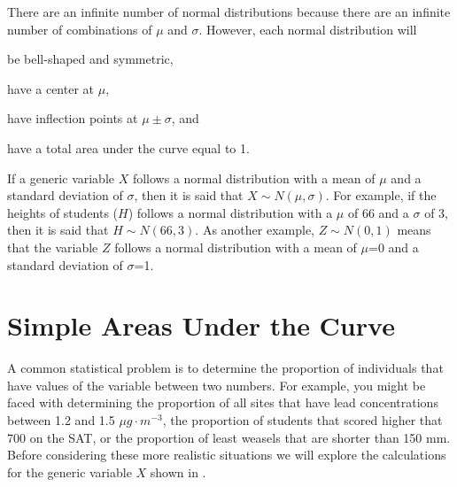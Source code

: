 \documentclass[10pt,openany]{book}\usepackage[]{graphicx}\usepackage[]{color}
\begin{document}

\begin{minipage}{\textwidth}
There are an infinite number of normal distributions because there are an infinite number of combinations of $\mu$ and $\sigma$.  However, each normal distribution will
\begin{Enumerate}
  \item be bell-shaped and symmetric,
  \item have a center at $\mu$,
  \item have inflection points at $\mu \pm \sigma$, and
  \item have a total area under the curve equal to 1.
\end{Enumerate}
\end{minipage}


If a generic variable $X$ follows a normal distribution with a mean of $\mu$ and a standard deviation of $\sigma$, then it is said that $X\sim N(\mu,\sigma)$.  For example, if the heights of students ($H$) follows a normal distribution with a $\mu$ of 66 and a $\sigma$ of 3, then it is said that $H\sim N(66,3)$.  As another example, $Z\sim N(0,1)$ means that the variable $Z$ follows a normal distribution with a mean of $\mu$=0 and a standard deviation of $\sigma$=1.



\section{Simple Areas Under the Curve}
A common statistical problem is to determine the proportion of individuals that have values of the variable between two numbers.  For example, you might be faced with determining the proportion of all sites that have lead concentrations between 1.2 and 1.5 $\mu g \cdot m^{-3}$, the proportion of students that scored higher that 700 on the SAT, or the proportion of least weasels that are shorter than 150 mm.  Before considering these more realistic situations we will explore the calculations for the generic variable $X$ shown in .
\end{document}

